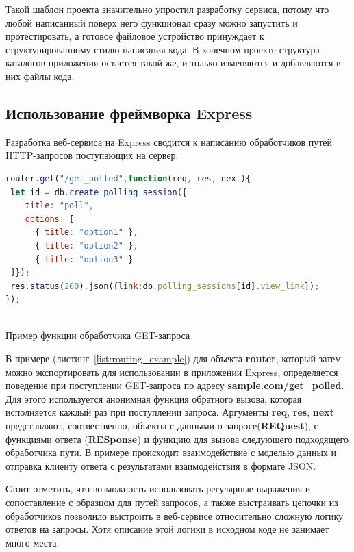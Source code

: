 Такой шаблон проекта значительно упростил разработку сервиса, потому что любой написанный поверх него функционал сразу можно запустить и протестировать, а готовое файловое устройство принуждает к структурированному стилю написания кода. В конечном проекте структура каталогов приложения остается такой же, и только изменяются и добавляются в них файлы кода.      
\subsection{Использование фреймворка Express}
Разработка веб-сервиса на Express сводится к написанию обработчиков путей HTTP-запросов поступающих на сервер.
\begin{ListingEnv}[H]
\begin{lstlisting}[language=JavaScript]
router.get("/get_polled",function(req, res, next){
 let id = db.create_polling_session({
	title: "poll",
	options: [
	  { title: "option1" },
	  { title: "option2" },
	  { title: "option3" }
 ]});
 res.status(200).json({link:db.polling_sessions[id].view_link});
});
	
\end{lstlisting}
\caption{Пример функции обработчика GET-запроса}
\label{list:routing_example}
\end{ListingEnv}
В примере (листинг~\ref{list:routing_example}) для объекта \textbf{router}, который затем можно экспортировать для использовании в приложении Express, определяется поведение при поступлении GET-запроса по адресу \textbf{sample.com/get\_polled}. Для этого используется анонимная функция обратного вызова, которая исполняется каждый раз при поступлении запроса. Аргументы \textbf{req}, \textbf{res}, \textbf{next} представляют, соотвественно, объекты с данными о запросе(\textbf{REQuest}), с функциями ответа (\textbf{RESponse}) и функцию для вызова следующего подходящего обработчика пути. В примере происходит взаимодействие с моделью данных и отправка клиенту ответа с результатами взаимодействия в формате JSON.

Стоит отметить, что возможность использовать регулярные выражения и сопоставление с образцом для путей запросов, а также выстраивать цепочки из обработчиков позволило выстроить в веб-сервисе относительно сложную логику ответов на запросы. Хотя описание этой логики в исходном коде не занимает много места.  

